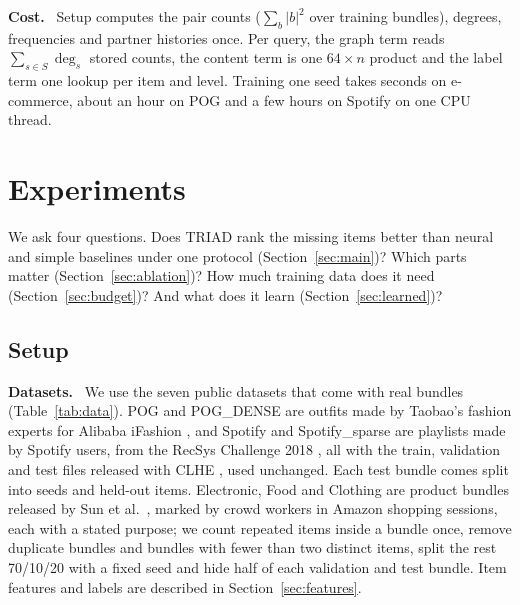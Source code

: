 \documentclass[runningheads]{llncs}
\renewcommand{\paragraph}[1]{\smallskip\noindent\textbf{#1}\ }
\begin{document}
\paragraph{Cost.} Setup computes the pair counts ($\sum_b|b|^2$ over training bundles), degrees, frequencies and
partner histories once. Per query, the graph term reads $\sum_{s\in S}\deg_s$ stored counts, the content term is one
$64\times n$ product and the label term one lookup per item and level. Training one seed takes seconds on
e-commerce, about an hour on POG and a few hours on Spotify on one CPU thread.

\section{Experiments}

We ask four questions. Does TRIAD rank the missing items better than neural and simple baselines under one protocol
(Section~\ref{sec:main})? Which parts matter (Section~\ref{sec:ablation})? How much training data does it need
(Section~\ref{sec:budget})? And what does it learn (Section~\ref{sec:learned})?

\subsection{Setup}

\paragraph{Datasets.} We use the seven public datasets that come with real bundles (Table~\ref{tab:data}). POG and
POG\_DENSE are outfits made by Taobao's fashion experts for Alibaba iFashion \cite{pog}, and Spotify and
Spotify\_sparse are playlists made by Spotify users, from the RecSys Challenge 2018 \cite{spotify}, all with the train, validation and test files released with CLHE \cite{clhe}, used
unchanged. Each test bundle comes split into seeds and held-out items. Electronic, Food and Clothing are product
bundles released by Sun et al.\ \cite{bundlerec}, marked by crowd workers in Amazon shopping sessions, each with a
stated purpose; we count repeated items inside a bundle once, remove duplicate bundles and
bundles with fewer than two distinct items, split the rest 70/10/20 with a fixed seed and hide half of each validation
and test bundle. Item features and labels are described in
Section~\ref{sec:features}.
\end{document}

